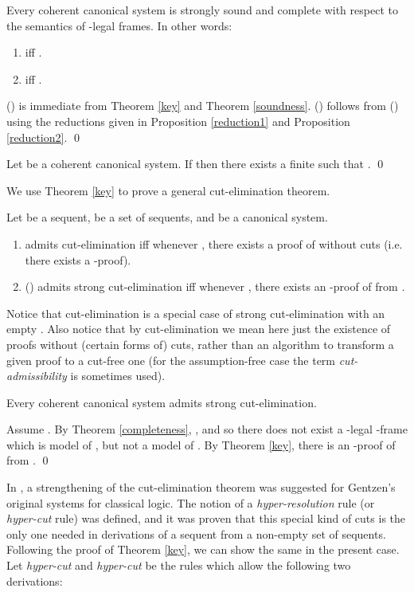 \documentclass{LMCS}
\theoremstyle{remark}
\newcommand{\be}{\begin{enumerate}[(1)]}
\newcommand{\ee}{\end{enumerate}}
\begin{document}
\begin{enumerate}[(a)]
\begin{enumerate}[\bf(a):]
\sloppy
\begin{thm}
\label{completeness}
Every coherent canonical system 
is strongly sound and complete with respect to the semantics
of -legal frames. In other words:
\be
\item  iff .
\item  iff .
\ee
\end{thm}

\fussy
\proof
() is immediate from Theorem \ref{key} and Theorem \ref{soundness}.
() follows from () using the reductions given 
in Proposition \ref{reduction1} and Proposition \ref{reduction2}.
\qed

\begin{cor}[Compactness]
Let  be a coherent canonical system.
If  
then there exists a finite  such that 
.
\qed
\end{cor}

We use Theorem \ref{key} to prove a general cut-elimination theorem.

\begin{defi}
\label{cut elimination}
Let  be a sequent,  be a set of sequents,
and  be a canonical system.
\be
\item  admits cut-elimination iff whenever , there exists
a proof of  without cuts (i.e. there exists a -proof).
\item (\cite{Av93})  admits strong
cut-elimination iff whenever  , there exists
an -proof of  from .
\ee
\end{defi}

Notice that cut-elimination is a special case of strong cut-elimination with an empty .
Also notice that by cut-elimination we mean here just the existence of proofs without (certain forms
of) cuts, rather than an algorithm to transform a given proof to a cut-free one (for
the assumption-free case the term {\em cut-admissibility} is sometimes used).

\begin{thm}
\label{cut-elimination}
Every coherent canonical system 
admits strong cut-elimination.
\end{thm}
\proof
Assume .
By  Theorem \ref{completeness}, ,
and so there does not exist a -legal -frame 
which is model of , but not a model of .
By Theorem \ref{key}, there is an -proof of  from .
\qed

\begin{rem}
\label{hyper-cut}
In \cite{Av93}, a strengthening of the cut-elimination theorem was suggested
for Gentzen's original systems for classical logic. 
The notion of a {\em hyper-resolution} rule (or {\em hyper-cut} rule) was defined,
and it was proven that this special kind of cuts is the only one needed in derivations
of a sequent from a non-empty set of sequents.
Following the proof of Theorem \ref{key}, we can show the same in the present case.
Let {\em hyper-cut} and {\em hyper-cut} be the rules which allow the following two derivations:



\end{rem}
\end{enumerate}
\end{enumerate}
\end{document}
